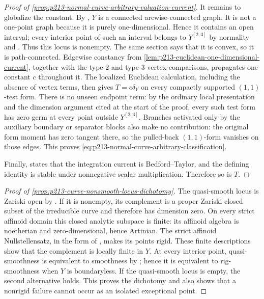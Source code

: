 \begin{proof}[Proof of
\cref{prop:p213-normal-curve-arbitrary-valuation-current}]
It remains to globalize the constant.  By
\cite[Theorem~3.5.1 and §1.3.5]{Ducros24CurveStructure}, $Y$ is a connected
arcwise-connected graph.  It is not a one-point graph because it is purely
one-dimensional.  Hence it contains an open interval; every interior point
of such an interval belongs to $Y^{[2,3]}$ by normality and
\cite[§4.5.11]{Ducros24CurveStructure}.  Thus this locus is nonempty.  The
same section says that it is convex, so it is path-connected.  Edgewise
constancy from \cref{lem:p213-euclidean-one-dimensional-current}, together
with the type-$2$ and type-$3$ vertex comparisons, propagates one constant
$c$ throughout it.  The localized Euclidean calculation, including the
absence of vertex terms, then gives
$T=c\delta_Y$ on every compactly supported $(1,1)$-test form.  There is no
unseen endpoint term: by the ordinary local presentation and the dimension
argument cited at the start of the proof, every such test form has zero germ
at every point outside $Y^{[2,3]}$.  Branches activated only by the
auxiliary boundary or separator blocks also make no contribution: the
original form moment has zero tangent there, so the pulled-back
$(1,1)$-form vanishes on those edges.  This proves
\eqref{eq:p213-normal-curve-arbitrary-classification}.

Finally, \cite[Example~8.6.4]{CLD25} states that the integration current
is Bedford--Taylor, and the defining identity is stable under
nonnegative scalar multiplication.  Therefore so is $T$.
\end{proof}

\begin{proof}[Proof of
\cref{prop:p213-curve-nonsmooth-locus-dichotomy}]
The quasi-smooth locus is Zariski open by
\cite[§3.1.11]{Ducros24CurveStructure}.  If it is nonempty, its
complement is a proper Zariski closed subset of the irreducible curve and
therefore has dimension zero.  On every strict affinoid domain this
closed analytic subspace is finite: its affinoid algebra is noetherian
and zero-dimensional, hence Artinian.  The strict affinoid
Nullstellensatz, in the form of
\cite[Theorem~4.5]{Tate71Rigid}, makes its points rigid.  These finite descriptions show
that the complement is locally finite in $Y$.  At every interior point,
quasi-smoothness is equivalent to smoothness by
\cite[§3.1.11.4]{Ducros24CurveStructure}; hence it is equivalent to
rig-smoothness when $Y$ is boundaryless.  If the quasi-smooth locus is
empty, the second alternative holds.  This proves the dichotomy and also
shows that a nonrigid failure cannot occur as an isolated exceptional
point.
\end{proof}

